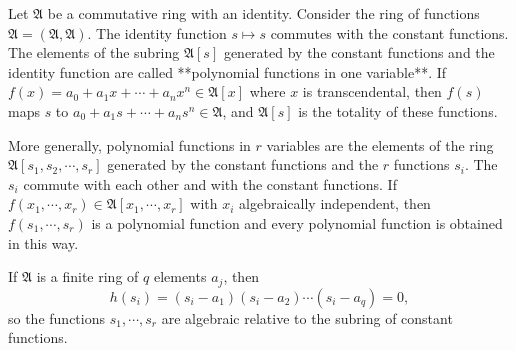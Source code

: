 Let $\mathfrak{A}$ be a commutative ring with an identity. Consider the ring of functions $\mathfrak{A} = (\mathfrak{A}, \mathfrak{A})$. The identity function $s \mapsto s$ commutes with the constant functions. The elements of the subring $\mathfrak{A}[s]$ generated by the constant functions and the identity function are called **polynomial functions in one variable**. If $f(x) = a_0 + a_1x + \cdots + a_nx^n \in \mathfrak{A}[x]$ where $x$ is transcendental, then $f(s)$ maps $s$ to $a_0 + a_1s + \cdots + a_ns^n \in \mathfrak{A}$, and $\mathfrak{A}[s]$ is the totality of these functions.

More generally, polynomial functions in $r$ variables are the elements of the ring $\mathfrak{A}[s_1, s_2, \cdots, s_r]$ generated by the constant functions and the $r$ functions $s_i$. The $s_i$ commute with each other and with the constant functions. If $f(x_1, \cdots, x_r) \in \mathfrak{A}[x_1, \cdots, x_r]$ with $x_i$ algebraically independent, then $f(s_1, \cdots, s_r)$ is a polynomial function and every polynomial function is obtained in this way.

If $\mathfrak{A}$ is a finite ring of $q$ elements $a_j$, then
$$h(s_i) = (s_i - a_1)(s_i - a_2) \cdots (s_i - a_q) = 0,$$
so the functions $s_1, \cdots, s_r$ are algebraic relative to the subring of constant functions.
